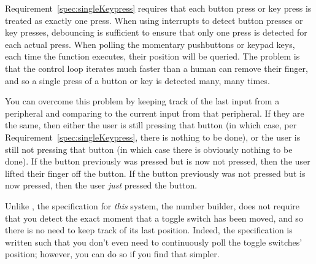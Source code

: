 Requirement~\ref{spec:singleKeypress} requires that each button press or key press is treated as exactly one press.
When using interrupts to detect button presses or key presses, debouncing is sufficient to ensure that only one press is detected for each actual press.
When polling the momentary pushbuttons or keypad keys, each time the  function executes, their position will be queried.
The problem is that the control loop iterates much faster than a human can remove their finger, and so a single press of a button or key is detected many, many times.

%

You can overcome this problem by keeping track of the last input from a peripheral and comparing to the current input from that peripheral.
If they are the same, then either the user is still pressing that button (in which case, per Requirement~\ref{spec:singleKeypress}, there is nothing to be done), or the user is still not pressing that button (in which case there is obviously nothing to be done).
If the button previously was pressed but is now not pressed, then the user lifted their finger off the button.
If the button previously was not pressed but is now pressed, then the user \textit{just} pressed the button.

Unlike , the specification for \textit{this} system, the number builder, does not require that you detect the exact moment that a toggle switch has been moved, and so there is no need to keep track of its last position.
Indeed, the specification is written such that you don't even need to continuously poll the toggle switches' position;
however, you can do so if you find that simpler.


